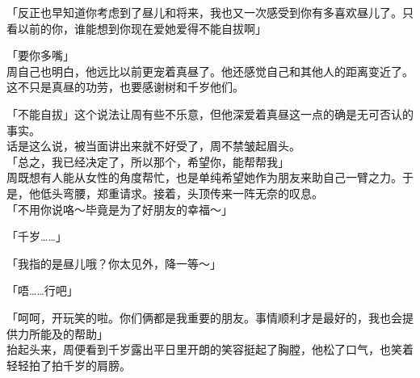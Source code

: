 「反正也早知道你考虑到了昼儿和将来，我也又一次感受到你有多喜欢昼儿了。只看以前的你，谁能想到你现在爱她爱得不能自拔啊」

「要你多嘴」\\

周自己也明白，他远比以前更宠着真昼了。他还感觉自己和其他人的距离变近了。这不只是真昼的功劳，也要感谢树和千岁他们。

「不能自拔」这个说法让周有些不乐意，但他深爱着真昼这一点的确是无可否认的事实。\\

话是这么说，被当面讲出来就不好受了，周不禁皱起眉头。\\

「总之，我已经决定了，所以那个，希望你，能帮帮我」\\

周既想有人能从女性的角度帮忙，也是单纯希望她作为朋友来助自己一臂之力。于是，他低头弯腰，郑重请求。接着，头顶传来一阵无奈的叹息。\\

「不用你说咯～毕竟是为了好朋友的幸福～」

「千岁……」

「我指的是昼儿哦？你太见外，降一等～」

「唔……行吧」

「呵呵，开玩笑的啦。你们俩都是我重要的朋友。事情顺利才是最好的，我也会提供力所能及的帮助」\\

抬起头来，周便看到千岁露出平日里开朗的笑容挺起了胸膛，他松了口气，也笑着轻轻拍了拍千岁的肩膀。
